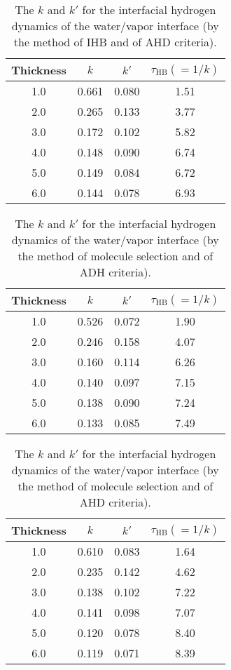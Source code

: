 {\begin{table}[htb]
\centering
\caption{\label{tab:k_k_prime_tau_128w_pure_ihb_AHD} 
    The $k$ and $k'$ for the interfacial hydrogen dynamics of the water/vapor interface (by the method of IHB and of AHD criteria).} 
\begin{tabular}{cccc}
 Thickness & $k$ & $k'$ & $\tau_{\text{HB}} (=1/k)$ \\
\hline
  1.0 & 0.661 & 0.080 & 1.51  \\
  2.0 & 0.265 & 0.133 & 3.77  \\
  3.0 & 0.172 & 0.102 & 5.82  \\
  4.0 & 0.148 & 0.090 & 6.74  \\
  5.0 & 0.149 & 0.084 & 6.72  \\
  6.0 & 0.144 & 0.078 & 6.93  \\
\end{tabular}
\end{table}

\begin{table}[H]
\centering
\caption{\label{tab:k_k_prime_tau_128w_pure_ihb_scheme1_ADH} 
    The $k$ and $k'$ for the interfacial hydrogen dynamics of the water/vapor interface (by the method of molecule selection and of ADH criteria).} 
\begin{tabular}{cccc}
 Thickness & $k$ & $k'$ & $\tau_{\text{HB}} (=1/k)$ \\
\hline
  1.0 & 0.526 & 0.072 & 1.90  \\
  2.0 & 0.246 & 0.158 & 4.07  \\
  3.0 & 0.160 & 0.114 & 6.26  \\
  4.0 & 0.140 & 0.097 & 7.15  \\
  5.0 & 0.138 & 0.090 & 7.24  \\
  6.0 & 0.133 & 0.085 & 7.49  \\
\end{tabular}
\end{table}
\begin{table}[H]
\centering
\caption{\label{tab:k_k_prime_tau_128w_pure_ihb_AHD} 
    The $k$ and $k'$ for the interfacial hydrogen dynamics of the water/vapor interface (by the method of molecule selection and of AHD criteria).} 
\begin{tabular}{cccc}
 Thickness & $k$ & $k'$ & $\tau_{\text{HB}} (=1/k)$ \\
\hline
  1.0 & 0.610 & 0.083 & 1.64  \\
  2.0 & 0.235 & 0.142 & 4.62  \\
  3.0 & 0.138 & 0.102 & 7.22  \\
  4.0 & 0.141 & 0.098 & 7.07  \\
  5.0 & 0.120 & 0.078 & 8.40  \\
  6.0 & 0.119 & 0.071 & 8.39  \\
\end{tabular}
\end{table}

}
